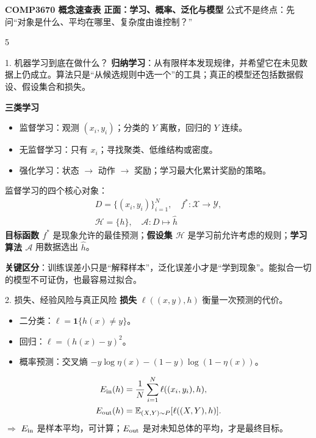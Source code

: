 \documentclass[a4paper,landscape,fontset=fandol]{ctexart}
\newcommand{\term}[1]{\textbf{\color{teal!80!black}#1}}
\newcommand{\warn}[1]{\textbf{\color{red}#1}}
\newcommand{\sense}[1]{\textcolor{muted}{\ensuremath{\Rightarrow} #1}}
\newcommand{\E}{\mathbb{E}}
\newcommand{\ind}{\mathbf{1}}
\begin{document}
\fontsize{6.70}{7.50}\selectfont

\begin{center}
  {\fontsize{14}{15}\selectfont\bfseries\color{navy} COMP3670 概念速查表}\quad
  {\large\bfseries\color{teal}正面：学习、概率、泛化与模型}
  \hfill {\scriptsize 公式不是终点：先问“对象是什么、平均在哪里、复杂度由谁控制？”}
\end{center}
\vspace{-1.5mm}

\begin{multicols*}{5}

\begin{boxx}{1. 机器学习到底在做什么？}
\term{归纳学习}：从有限样本发现规律，并希望它在未见数据上仍成立。算法只是“从候选规则中选一个”的工具；真正的模型还包括数据假设、假设集合和损失。

\term{三类学习}
\begin{itemize}
  \item 监督学习：观测 $(x_i,y_i)$；分类的 $Y$ 离散，回归的 $Y$ 连续。
  \item 无监督学习：只有 $x_i$；寻找聚类、低维结构或密度。
  \item 强化学习：状态 $\to$ 动作 $\to$ 奖励；学习最大化累计奖励的策略。
\end{itemize}

监督学习的四个核心对象：
\[
\begin{gathered}
D=\{(x_i,y_i)\}_{i=1}^N,\quad f^*:\mathcal X\to\mathcal Y,\\
\mathcal H=\{h\},\quad \mathcal A:D\mapsto \hat h
\end{gathered}
\]
\term{目标函数 $f^*$} 是现象允许的最佳预测；\term{假设集 $\mathcal H$} 是学习前允许考虑的规则；\term{学习算法 $\mathcal A$} 用数据选出 $\hat h$。

\warn{关键区分}：训练误差小只是“解释样本”，泛化误差小才是“学到现象”。能拟合一切的模型不可证伪，也最容易过拟合。
\end{boxx}

\begin{boxx}{2. 损失、经验风险与真正风险}
\term{损失} $\ell((x,y),h)$ 衡量一次预测的代价。
\begin{itemize}
  \item 二分类：$\ell=\ind\{h(x)\neq y\}$。
  \item 回归：$\ell=(h(x)-y)^2$。
  \item 概率预测：交叉熵 $-y\log\eta(x)-(1-y)\log(1-\eta(x))$。
\end{itemize}
\[
\begin{aligned}
E_{\rm in}(h)&=\frac1N\sum_{i=1}^N\ell((x_i,y_i),h),\\
E_{\rm out}(h)&=\E_{(X,Y)\sim P}[\ell((X,Y),h)].
\end{aligned}
\]
\sense{$E_{\rm in}$ 是样本平均，可计算；$E_{\rm out}$ 是对未知总体的平均，才是最终目标。}


\end{boxx}
\end{multicols*}
\end{document}
